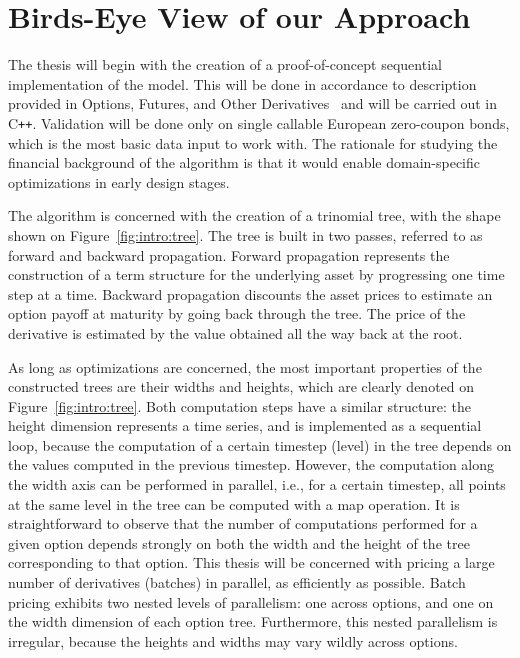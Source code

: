 \newpage
\section{Birds-Eye View of our Approach}
\label{section:solution}
The thesis will begin with the creation of a proof-of-concept sequential implementation of the model. This will be done in accordance to description provided in Options, Futures, and Other Derivatives~\cite{ofod} and will be carried out in C\texttt{++}. Validation will be done only on single callable European zero-coupon bonds, which is the most basic data input to work with. The rationale for studying the financial background of the  algorithm is that it would enable domain-specific optimizations in early design stages.

The algorithm is concerned with the creation of a trinomial tree, with the shape shown on Figure~\ref{fig:intro:tree}. The tree is built in two passes, referred to as forward and backward propagation. Forward propagation represents the construction of a term structure for the underlying asset by progressing one time step at a time. Backward propagation discounts the asset prices to estimate an option payoff at maturity by going back through the tree. The price of the derivative is estimated by the value obtained all the way back at the root. 

As long as optimizations are concerned, the most important properties of the constructed trees are their widths and heights, which are clearly denoted on Figure~\ref{fig:intro:tree}. Both computation steps have a similar structure: the height dimension represents a time series, and is implemented as a sequential loop, because the computation of a certain timestep (level) in the tree depends on the values computed in the previous timestep. However, the computation along the width axis can be performed in parallel, i.e., for a certain timestep, all points at the same level in the tree can be computed with a map operation. 
%
%
It is straightforward to observe that the number of computations performed for a given option depends strongly on both the width and the height of the tree corresponding to that option. This thesis will be concerned with pricing a large number of derivatives (batches) in parallel, as efficiently as possible. Batch pricing exhibits two nested levels of parallelism: one across options, and one on the width dimension of each option tree. Furthermore, this nested parallelism is irregular, because the heights and widths may vary wildly across options. 

